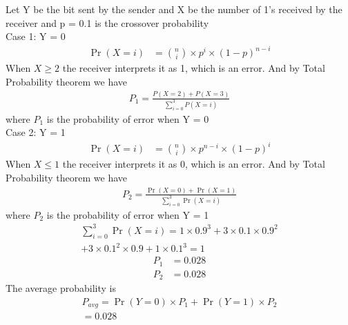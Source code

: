 Let Y be the bit sent by the sender and X be the number of 1's received by the receiver and p = 0.1 is the crossover probability
\\
{Case 1: Y = 0}
\begin{align}
    \Pr(X = i) &= \binom{n}{i}\times p^i\times (1-p)^{n-i}
\end{align}
When $X \geq 2 $ the receiver interprets it as 1, which is an error. And by Total Probability theorem we have\\
\begin{align}
P_1 = \frac{P(X = 2) + P(X = 3)}{\sum_{i=0}^3P(X = i)}
\end{align}
where $P_1$ is the probability of error when Y = 0
\\
{Case 2: Y = 1}
\begin{align}
\Pr(X = i) &= \binom{n}{i}\times p^{n-i}\times (1-p)^i
\end{align}
When $X \leq 1 $ the receiver interprets it as 0, which is an error. And by Total Probability theorem we have
\begin{align}
P_2 = \frac{\Pr(X = 0) + \Pr(X = 1)}{\sum_{i=0}^3\Pr(X = i)}
\end{align}
where $P_2$ is the probability of error when Y = 1
\begin{multline}
\sum_{i=0}^3\Pr(X = i) = 1\times 0.9^3 + 3\times 0.1\times 0.9^2 \\
+ 3\times 0.1^2 \times 0.9 + 1\times 0.1^3 = 1
\end{multline}
\begin{align}
P_1 &= 0.028\\
P_2 &= 0.028
\end{align}
The average probability is 
\begin{multline}
P_{avg} = \Pr(Y = 0)\times P_1 +\Pr(Y = 1)\times P_2\\ = 0.028 \end{multline}
\begin{table}[!ht]
\centering
{}
\caption{Probability of number of 1's recieved  }
\label{ec40:table:1}
\end{table}